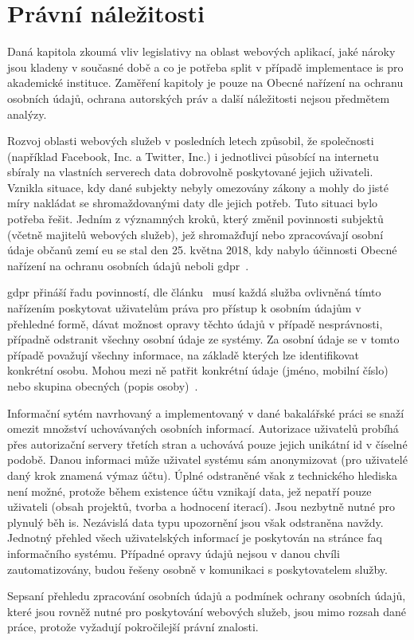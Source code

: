 \chapter{Právní náležitosti}

Daná kapitola zkoumá vliv legislativy na oblast webových aplikací, jaké nároky jsou kladeny v současné době a co je potřeba split v případě implementace \gls{is} pro akademické instituce. Zaměření kapitoly je pouze na Obecné nařízení na ochranu osobních údajů, ochrana autorských práv a další náležitosti nejsou předmětem analýzy.

Rozvoj oblasti webových služeb v posledních letech způsobil, že společnosti (například Facebook, Inc. a Twitter, Inc.) i jednotlivci působící na internetu sbíraly na vlastních serverech data dobrovolně poskytované jejich uživateli. Vznikla situace, kdy dané subjekty nebyly omezovány zákony a mohly do jisté míry nakládat se shromaždovanými daty dle jejich potřeb. Tuto situaci bylo potřeba řešit. Jedním z významných kroků, který změnil povinnosti subjektů (včetně majitelů webových služeb), jež shromažďují nebo zpracovávají osobní údaje občanů zemí \gls{eu} se stal den 25. května 2018, kdy nabylo účinnosti Obecné nařízení na ochranu osobních údajů neboli \gls{gdpr}~\cite{gdprDesc}. 

\gls{gdpr} přináší řadu povinností, dle článku~\cite{gdprPriprava} musí každá služba ovlivněná tímto nařízením poskytovat uživatelům práva pro přístup k osobním údajům v přehledné formě, dávat možnost opravy těchto údajů v případě nesprávnosti, případně odstranit všechny osobní údaje ze systémy. Za osobní údaje se v tomto případě považují všechny informace, na základě kterých lze identifikovat konkrétní osobu. Mohou mezi ně patřit konkrétní údaje (jméno, mobilní číslo) nebo skupina obecných (popis osoby)~\cite{gdprPrakticky}.

Informační sytém navrhovaný a implementovaný v dané bakalářské práci se snaží omezit množství uchovávaných osobních informací. Autorizace uživatelů probíhá přes autorizační servery třetích stran a uchovává pouze jejich unikátní \gls{id} v číselné podobě. Danou informaci může uživatel systému sám anonymizovat (pro uživatelé daný krok znamená výmaz účtu). Úplné odstraněné však z technického hlediska není možné, protože během existence účtu vznikají data, jež nepatří pouze uživateli (obsah projektů, tvorba a hodnocení iterací). Jsou nezbytně nutné pro plynulý běh \gls{is}. Nezávislá data typu upozornění jsou však odstraněna navždy. Jednotný přehled všech uživatelských informací je poskytován na stránce \gls{faq} informačního systému. Případné opravy údajů nejsou v danou chvíli zautomatizovány, budou řešeny osobně v komunikaci s poskytovatelem služby.

Sepsaní přehledu zpracování osobních údajů a podmínek ochrany osobních údajů, které jsou rovněž nutné pro poskytování webových služeb, jsou mimo rozsah dané práce, protože vyžadují pokročilejší právní znalosti.